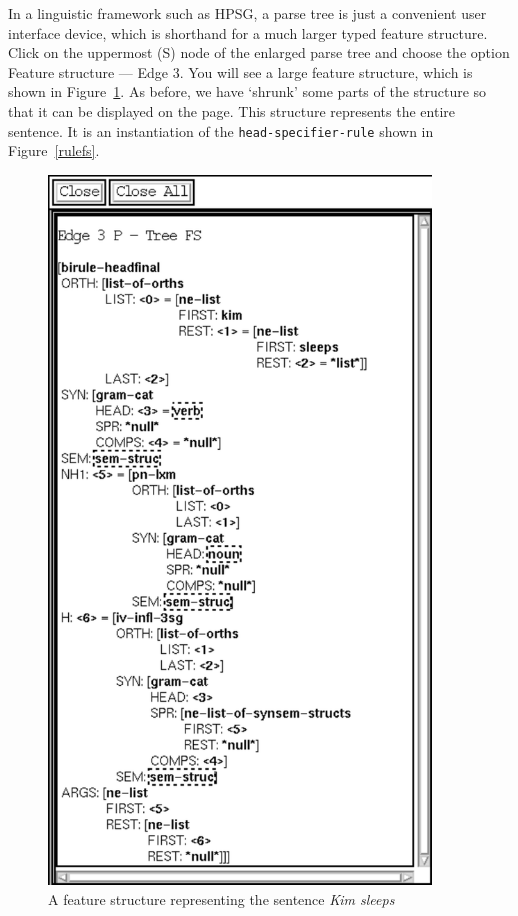 \documentclass[12pt]{report}
\newcommand{\lkbentryname}[1]{{\tt #1}}
\newcommand{\lkbmenucommand}{{\bf}}
\begin{document}
In a linguistic framework such as HPSG, a parse tree is just a convenient
user interface device, which is shorthand for a much larger typed
feature structure.  Click on the uppermost (S) node of the
enlarged parse tree and choose the option 
{\lkbmenucommand Feature structure --- Edge 3}.  
You will
see a large feature structure, which is shown in Figure~\ref{bigfs}.
As before, we have `shrunk' some parts of the structure so that
it can be displayed on the page.
This structure represents the entire
sentence.  It is an instantiation of the \lkbentryname{head-specifier-rule}
shown in Figure~\ref{rulefs}.
\begin{figure}
\includegraphics[width=4in]{figs/bigfs}
\caption{A feature structure representing the sentence {\it Kim sleeps}}
\label{bigfs}
\end{figure}
\end{document}
